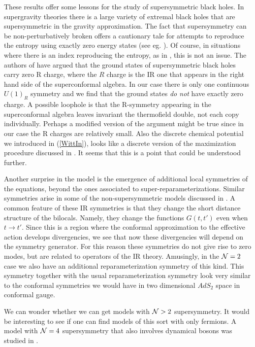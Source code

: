 \documentclass[aps,pre,preprint,onecolumn,citeautoscript,superscriptaddress,nofootinbib,eqsecnum]{revtex4-1}
\def\nref#1{(\ref{#1})}
\begin{document}
 These results offer some lessons for the study of supersymmetric black holes. In supergravity theories there is a large variety of extremal black holes that are supersymmetric in the gravity approximation. The fact that supersymmetry can be non-perturbatively broken offers a cautionary tale for attempts to reproduce 
 the entropy using exactly zero energy states (see eg. \cite{Kinney:2005ej,Chang:2013fba}). Of course, in situations where there is an index reproducing the entropy, as in \cite{Strominger:1996sh},
  this is not 
 an issue.  
 The authors of \cite{Benini:2015eyy}  have argued that the ground states of supersymmetric black holes carry zero R charge, where the $R$ charge is the IR one 
 that appears in the right hand side of the superconformal algebra. In our case there is only one continuous $U(1)_R$ symmetry and we find that
 the ground states {\it do not } have exactly zero charge. 
  A possible loophole is that the R-symmetry appearing in the superconformal algebra leaves invariant the thermofield double, not each copy individually. 
 Perhaps a modified version of the argument might be true since in our case the R charges are relatively small. Also the discrete chemical potential we 
 introduced in \nref{WittIn}, looks like a discrete version of the maximization procedure discussed in \cite{Benini:2015eyy}.  It seems that this is a point that could be 
 understood further. 
 
 Another surprise in the model is the emergence of additional local symmetries of the equations, beyond the ones associated to super-reparameterizations. 
 Similar symmetries arise in some of the non-supersymmetric models discussed in \cite{Gross:2016kjj}. 
 A common feature of these IR symmetries is that they change the short distance structure of the bilocals. Namely, they change the functions $G(t,t')$ even when 
 $t \to t'$. Since this is a region where the conformal approximation to the effective action develops divergencies, we see that now these divergencies will depend 
 on the symmetry generator. For this reason these symmetries do not give rise to zero modes, but are related to operators of the IR theory. 
 Amusingly, in the ${\cal N}=2$ case we also have an additional reparameterization symmetry of this kind. This symmetry together with the usual reparameterization
 symmetry look very similar to the conformal symmetries we would have in two dimensional $AdS_2$ space in conformal gauge. 
  
  We can wonder whether we can get models with ${\cal N} > 2$ supersymmetry.  It would be interesting to see if one can find models of this sort with only fermions. 
  A model with ${\cal N}=4$ supersymmetry that also involves dynamical bosons was studied in \cite{Anninos:2016szt}. 
   
\end{document}
